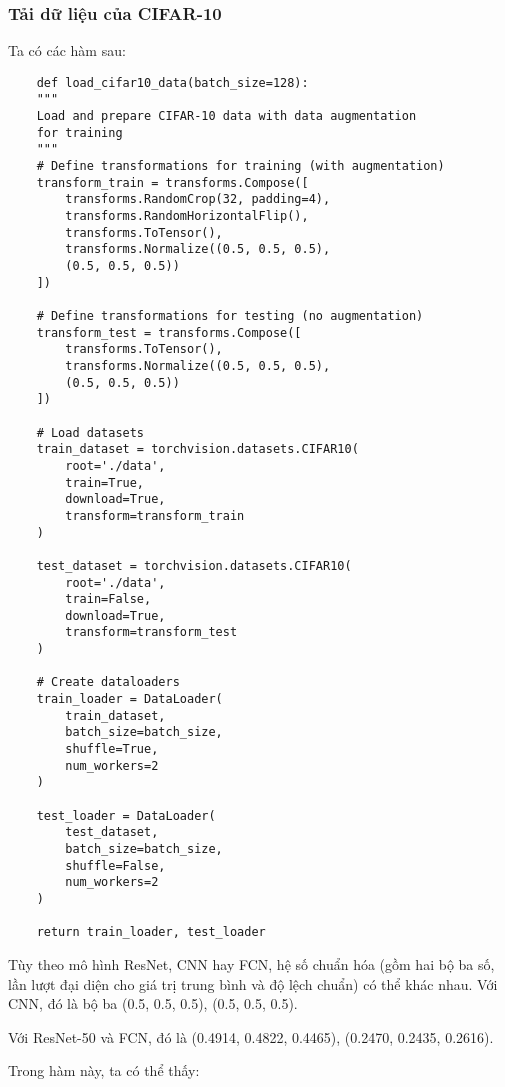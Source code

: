 \documentclass[../main.tex]{subfiles}
\begin{document}
\subsubsection*{Tải dữ liệu của CIFAR-10}

Ta có các hàm sau:

\begin{verbatim}
    def load_cifar10_data(batch_size=128):
    """
    Load and prepare CIFAR-10 data with data augmentation 
    for training
    """
    # Define transformations for training (with augmentation)
    transform_train = transforms.Compose([
        transforms.RandomCrop(32, padding=4),
        transforms.RandomHorizontalFlip(),
        transforms.ToTensor(),
        transforms.Normalize((0.5, 0.5, 0.5), 
        (0.5, 0.5, 0.5))
    ])
    
    # Define transformations for testing (no augmentation)
    transform_test = transforms.Compose([
        transforms.ToTensor(),
        transforms.Normalize((0.5, 0.5, 0.5), 
        (0.5, 0.5, 0.5))
    ])
    
    # Load datasets
    train_dataset = torchvision.datasets.CIFAR10(
        root='./data', 
        train=True,
        download=True, 
        transform=transform_train
    )
    
    test_dataset = torchvision.datasets.CIFAR10(
        root='./data', 
        train=False,
        download=True, 
        transform=transform_test
    )
    
    # Create dataloaders
    train_loader = DataLoader(
        train_dataset, 
        batch_size=batch_size,
        shuffle=True, 
        num_workers=2
    )
    
    test_loader = DataLoader(
        test_dataset, 
        batch_size=batch_size,
        shuffle=False, 
        num_workers=2
    )
    
    return train_loader, test_loader
\end{verbatim}

Tùy theo mô hình ResNet, CNN hay FCN, hệ số chuẩn hóa (gồm hai bộ ba số, lần lượt đại diện cho giá trị trung bình và độ lệch chuẩn) có thể khác nhau. Với CNN, đó là bộ ba (0.5, 0.5, 0.5), (0.5, 0.5, 0.5).

Với ResNet-50 và FCN, đó là (0.4914, 0.4822, 0.4465), (0.2470, 0.2435, 0.2616).

Trong hàm này, ta có thể thấy:
\end{document}
